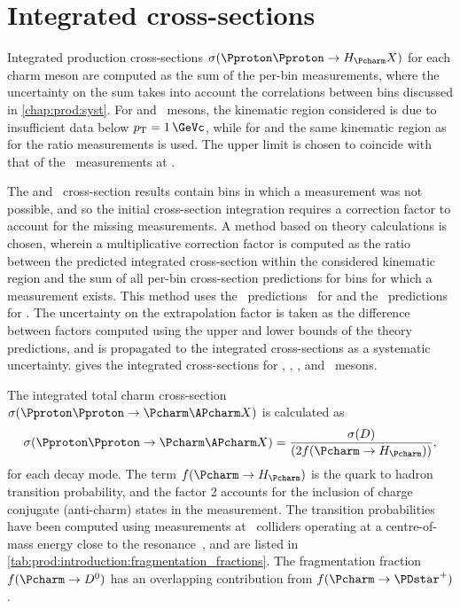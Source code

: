 \section{Integrated cross-sections}
\label{chap:prod:results:integrated}

Integrated production cross-sections $\xsec(\ppToHc{}X)$ for each charm meson 
are computed as the sum of the per-bin measurements, where the uncertainty on 
the sum takes into account the correlations between bins discussed in 
\cref{chap:prod:syst}.
For \PDsplus and \PDstarp\ mesons, the kinematic region considered is 
 due to insufficient data below $\pT = \SI{1}{\GeVc}$, 
while for \PDzero and \PDplus the same kinematic region as for the ratio 
measurements is used.
The upper limit is chosen to coincide with that of the \lhcb\ measurements at 
.

The \PDzero and \PDstarp\ cross-section results contain bins in which a 
measurement was not possible, and so the initial cross-section integration 
requires a correction factor to account for the missing measurements.
A method based on theory calculations is chosen, wherein a multiplicative 
correction factor is computed as the ratio between the predicted integrated 
cross-section within the considered kinematic region and the sum of all per-bin 
cross-section predictions for bins for which a measurement exists.
This method uses the \nnpdfl\ predictions~\cite{Gauld:2015yia} for \PDzero and 
the \fonll\ predictions~\cite{Cacciari:2015fta} for \PDstarp.
The uncertainty on the extrapolation factor is taken as the difference between 
factors computed using the upper and lower bounds of the theory predictions, 
and is propagated to the integrated cross-sections as a systematic uncertainty.
 gives the integrated 
cross-sections for \PDzero, \PDplus, \PDsplus, and \PDstarp\ mesons.

The integrated total charm cross-section $\xsec(\ppToccbarX)$ is calculated as 
\begin{equation}
  \xsec(\ppToccbarX) = \frac{\xsec(D)}{(2f(\cToHc))},
\end{equation}
for each decay mode.
The term $f(\cToHc)$ is the quark to hadron transition probability, and the 
factor 2 accounts for the inclusion of charge conjugate (anti-charm) states in 
the measurement.
The transition probabilities have been computed using measurements at \epem\ 
colliders operating at a centre-of-mass energy close to the \PUpsilonFourS 
resonance~\cite{PDG2008}, and are listed in 
\cref{tab:prod:introduction:fragmentation_fractions}.
The fragmentation fraction $f(\decay{\Pcharm}{\PDzero})$ has an overlapping 
contribution
from $f(\decay{\Pcharm}{\PDstarp})$.

